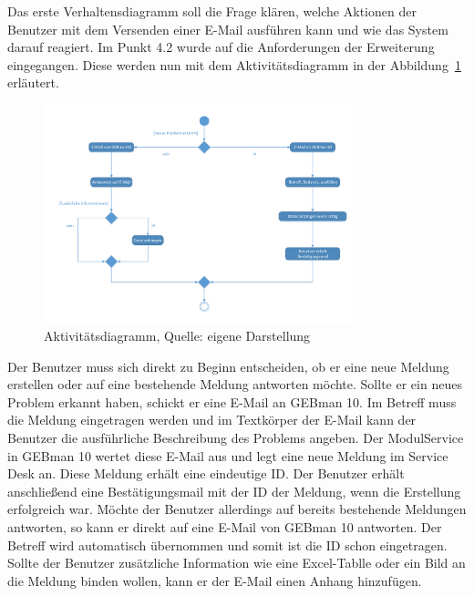 \noindent
Das erste Verhaltensdiagramm soll die Frage klären, welche Aktionen der Benutzer mit dem Versenden einer E-Mail ausführen kann und wie das System darauf reagiert. Im Punkt 4.2 wurde auf die Anforderungen der Erweiterung eingegangen. Diese werden nun mit dem Aktivitätsdiagramm  in der Abbildung~\ref{fig:Aktivitaetsdiagramm} erläutert.

\begin{figure}[h!]
\centering
\includegraphics[width=0.80\textwidth]{Abbildungen/Aktivitaetsdiagramm.pdf}
	\caption[Aktivit{\"a}tsdiagramm]{Aktivit{\"a}tsdiagramm, Quelle: eigene Darstellung}
	\label{fig:Aktivitaetsdiagramm}
\end{figure}

\noindent
Der Benutzer muss sich direkt zu Beginn entscheiden, ob er eine neue Meldung erstellen oder auf eine bestehende Meldung antworten möchte. Sollte er ein neues Problem erkannt haben, schickt er eine E-Mail an GEBman 10. Im Betreff muss die Meldung eingetragen werden und im Textkörper der E-Mail kann der Benutzer die ausführliche Beschreibung des Problems angeben. Der ModulService in  GEBman 10 wertet diese E-Mail aus und legt eine neue Meldung im Service Desk an. Diese Meldung erhält eine eindeutige ID. Der Benutzer erhält anschließend eine Bestätigungsmail mit der ID der Meldung, wenn die Erstellung erfolgreich war.\newline
Möchte der Benutzer allerdings auf bereits bestehende Meldungen antworten, so kann er direkt auf eine E-Mail von GEBman 10 antworten. Der Betreff wird automatisch übernommen und somit ist die ID schon eingetragen. Sollte der Benutzer zusätzliche Information wie eine Excel-Tablle oder ein Bild an die Meldung binden wollen, kann er der E-Mail einen Anhang hinzufügen.\\\\

